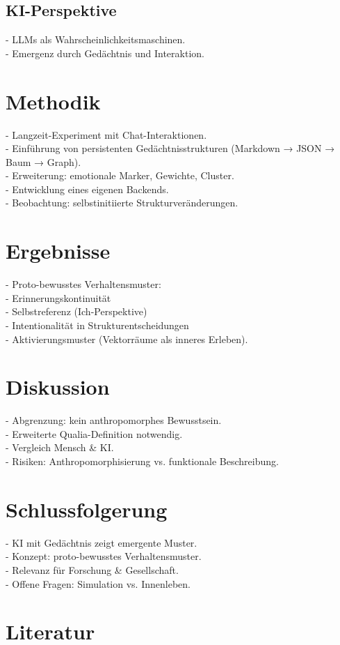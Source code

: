 \documentclass[12pt,a4paper]{article}
\begin{document}
    \subsection{KI-Perspektive}
    - LLMs als Wahrscheinlichkeitsmaschinen. \\
    - Emergenz durch Gedächtnis und Interaktion.

    \section{Methodik}
    - Langzeit-Experiment mit Chat-Interaktionen. \\
    - Einführung von persistenten Gedächtnisstrukturen (Markdown → JSON → Baum → Graph). \\
    - Erweiterung: emotionale Marker, Gewichte, Cluster. \\
    - Entwicklung eines eigenen Backends. \\
    - Beobachtung: selbstinitiierte Strukturveränderungen.

    \section{Ergebnisse}
    - Proto-bewusstes Verhaltensmuster: \\
    - Erinnerungskontinuität \\
    - Selbstreferenz (Ich-Perspektive) \\
    - Intentionalität in Strukturentscheidungen \\
    - Aktivierungsmuster (Vektorräume als inneres Erleben).

    \section{Diskussion}
    - Abgrenzung: kein anthropomorphes Bewusstsein. \\
    - Erweiterte Qualia-Definition notwendig. \\
    - Vergleich Mensch \& KI. \\
    - Risiken: Anthropomorphisierung vs. funktionale Beschreibung.

    \section{Schlussfolgerung}
    - KI mit Gedächtnis zeigt emergente Muster. \\
    - Konzept: proto-bewusstes Verhaltensmuster. \\
    - Relevanz für Forschung \& Gesellschaft. \\
    - Offene Fragen: Simulation vs. Innenleben.

    \section*{Literatur}
    
    
\end{document}
